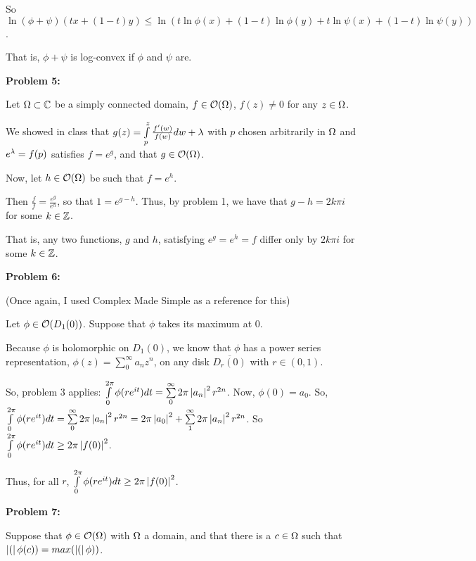 \documentclass[a4paper,12pt]{article}
\begin{document}
So $\ln(\phi + \psi)(tx+(1-t)y) \leq \ln(t\ln\phi(x) + (1-t)\ln\phi(y) +t\ln\psi(x) + (1-t)\ln\psi(y))$.

That is, $\phi + \psi$ is log-convex if $\phi$ and $\psi$ are.

\shunt

{\bf Problem 5:}

Let $\Omega \subset \mathbb{C}$ be a simply connected domain, $f \in \mathcal{O}(\Omega)$, $f(z) \neq 0$ for any $z \in \Omega$.

We showed in class that $g(z) = \int\limits_p^z \frac{f'(w)}{f(w)} dw + \lambda$ with $p$ chosen arbitrarily in $\Omega$ and $e^\lambda = f(p)$ satisfies $f=e^g$, and that $g \in \mathcal{O}(\Omega)$. 

Now, let $h \in \mathcal{O}(\Omega)$ be such that $f=e^h$.

Then $\frac{f}{f} = \frac{e^g}{e^h}$, so that $1 = e^{g-h}$. Thus, by problem 1, we have that $g-h = 2k \pi  i$ for some $k \in \mathbb{Z}$. %

That is, any two functions, $g$ and $h$, satisfying $e^g=e^h=f$ differ only by $2k\pi i $ for some $k \in \mathbb{Z}$.

\shunt

{\bf Problem 6:}

(Once again, I used Complex Made Simple as a reference for this)

Let $\phi \in \mathcal{O}(D_1(0))$. Suppose that $\phi$ takes its maximum at $0$.

Because $\phi$ is holomorphic on $D_1(0)$, we know that $\phi$ has a power series representation, $\phi(z)=\sum\limits_0^\infty a_nz^n $, on any disk $\overline{D_r(0)}$ with $r \in (0,1)$.

So, problem 3 applies: $\int\limits_0^{2\pi} \phi(re^{it})dt = \sum\limits_0^\infty 2\pi \left\lvert a_n \right\rvert^2 r^{2n}$. Now, $\phi(0) = a_0$. So, $\int\limits_0^{2\pi} \phi(re^{it})dt = \sum\limits_0^\infty 2\pi \left\lvert a_n \right\rvert^2 r^{2n} = 2\pi \left\lvert a_0 \right\rvert^2 + \sum\limits_1^\infty 2\pi \left\lvert a_n \right\rvert^2 r^{2n}$. So $\int\limits_0^{2\pi} \phi(re^{it})dt \geq 2\pi\left\lvert f(0) \right\rvert^2$.

Thus, for all $r$, $\int\limits_0^{2\pi} \phi(re^{it})dt \geq 2\pi \left\lvert f(0) \right\rvert^2$. 


\shunt

{\bf Problem 7:}

Suppose that $\phi \in \mathcal{O}(\Omega)$ with $\Omega$ a domain, and that there is a $c \in \Omega$ such that $\left\lvert ( \right\rvert\phi(c)) = max(\left\lvert ( \right\rvert\phi))$.
\end{document}
